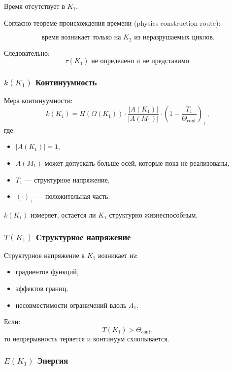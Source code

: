 Время отсутствует в $K_1$.

Согласно теореме происхождения времени (physics construction route):

\[
\text{время возникает только на } K_2 \text{ из неразрушаемых циклов}.
\]

Следовательно:
\[
\tau(K_1) \text{ не определено и не представимо}.
\]

\subsubsection{\texorpdfstring{$k(K_1)$}{k(K_1)} Континуумность}

Мера континуумности:
\[
k(K_1) =
H(\Omega(K_1)) \cdot
\frac{|A(K_1)|}{|A(M_1)|} \cdot
(1 - \frac{T_1}{\Theta_{\mathrm{cont}}})_+,
\]
где:
\begin{itemize}
    \item $|A(K_1)| = 1$,
    \item $A(M_1)$ может допускать больше осей, которые пока не реализованы,
    \item $T_1$ — структурное напряжение,
    \item $(\cdot)_+$ — положительная часть.
\end{itemize}

$k(K_1)$ измеряет, остаётся ли $K_1$ структурно жизнеспособным.

\subsubsection{\texorpdfstring{$T(K_1)$}{T(K_1)} Структурное напряжение}

Структурное напряжение в $K_1$ возникает из:
\begin{itemize}
    \item градиентов функций,
    \item эффектов границ,
    \item несовместимости ограничений вдоль $A_1$.
\end{itemize}

Если:
\[
T(K_1) > \Theta_{\mathrm{cont}},
\]
то непрерывность теряется и континуум схлопывается.

\subsubsection{\texorpdfstring{$E(K_1)$}{E(K_1)} Энергия}

